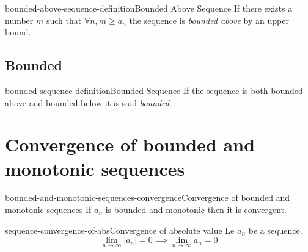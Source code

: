 \documentclass[preview]{standalone}
\begin{document}
\begin{snippetdefinition}{bounded-above-sequence-definition}{Bounded Above Sequence}
    If there exists a number \(m\) such that \(\forall n, m \geq a_n\)
    the sequence is \textit{bounded above} by an upper bound.
\end{snippetdefinition}

\subsection{Bounded}

\begin{snippetdefinition}{bounded-sequence-definition}{Bounded Sequence}
    If the sequence is both bounded above and bounded below it is
    said \textit{bounded}.
\end{snippetdefinition}

\section{Convergence of bounded and monotonic sequences}

\begin{snippettheorem}{bounded-and-monotonic-sequences-convergence}{Convergence of bounded and monotonic sequences}
    If \(a_n\) is bounded and monotonic then it is convergent.
\end{snippettheorem}

\begin{snippettheorem}{sequence-convergence-of-abs}{Convergence of absolute value}
    Le \(a_n\) be a sequence.
    \[ \lim_{n\to\infty} |a_n| = 0 \implies \lim_{n\to\infty} a_n = 0 \]
\end{snippettheorem}

\end{document}
